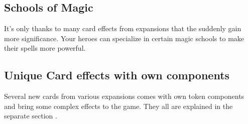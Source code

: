 \begin{multicols*}{2}
\subsection*{Schools of Magic}
It's only thanks to many card effects from expansions that the  suddenly gain more significance. Your heroes can specialize in certain magic schools to make their spells more powerful.

\subsection*{Unique Card effects with own components}
Several new cards from various expansions comes with own token components and bring some complex effects to the game. They all are explained in the separate section  .
\end{multicols*}
\pagebreak

